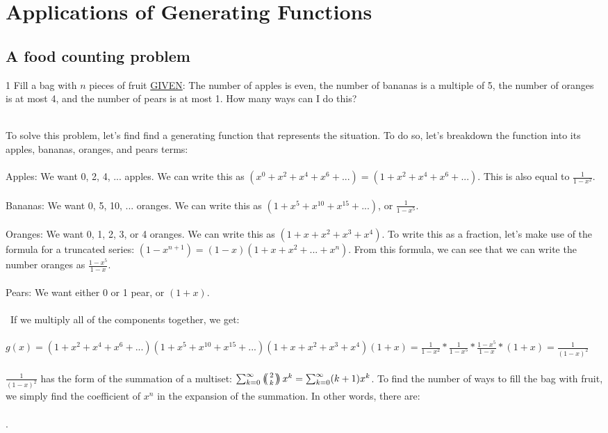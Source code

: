 \documentclass[11pt,twosided]{article}
\begin{document}
\section{Applications of Generating Functions}

\subsection{A food counting problem}
\begin{problem}1 Fill a bag with $n$ pieces of fruit \underline{GIVEN}: The number of apples is even, the number of bananas is a multiple of 5, the number of oranges is at most 4, and the number of pears is at most 1. How many ways can I do this? \end{problem}
\begin{solution}
\\To solve this problem, let's find find a generating function that represents the situation. To do so, let's breakdown the function into its apples, bananas, oranges, and pears terms:\\ \\
Apples: We want 0, 2, 4, ... apples. We can write this as $(x^0 + x^2 + x^4 + x^6 +...) = (1 + x^2 + x^4 + x^6 +...)$. This is also equal to $\frac{1}{1-x^2}$.\\\\
Bananas: We want 0, 5, 10, ... oranges. We can write this as $(1 + x^5 + x^10 + x^15 +...)$, or $\frac{1}{1-x^5}$.\\\\
Oranges: We want 0, 1, 2, 3, or 4 oranges. We can write this as $(1 + x + x^2 + x^3 + x^4)$. To write this as a fraction, let's make use of the formula for a truncated series: $(1-x^{n+1}) = (1-x)(1+x+x^2+...+x^n)$. From this formula, we can see that we can write the number oranges as $\frac{1-x^5}{1-x}$. \\\\
Pears: We want either 0 or 1 pear, or $(1+x)$.\\\\\
If we multiply all of the components together, we get: \\\\
$g(x) = (1 + x^2 + x^4 + x^6 +...)(1 + x^5 + x^10 + x^15 +...)(1 + x + x^2 + x^3 + x^4)(1+x) = \frac{1}{1-x^2}*\frac{1}{1-x^5}*\frac{1-x^5}{1-x}*(1+x) = \frac{1}{(1-x)^2}$ \\\\
$\frac{1}{(1-x)^2}$ has the form of the summation of a multiset: $\sum_{k = 0}^\infty \multiset{2}{k}x^k = \sum_{k = 0}^\infty (k+1)x^k$. To find the number of ways to fill the bag with fruit, we simply find the coefficient of $x^n$ in the expansion of the summation. In other words, there are:\\\\
\framebox{$(n+1)$ ways}.

\end{solution}
\end{document}
